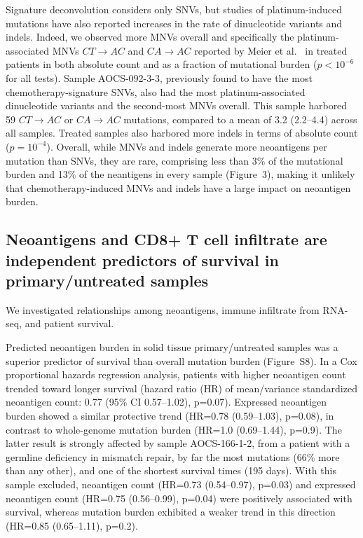 \documentclass[linenumbers]{bmcart}
\begin{document}
Signature deconvolution considers only SNVs, but studies of platinum-induced mutations have also reported increases in the rate of dinucleotide variants and indels. Indeed, we observed more MNVs overall and specifically the platinum-associated MNVs $CT \rightarrow AC$ and $CA \rightarrow AC$ reported by Meier et al.~\cite{Meier_2014} in treated patients in both absolute count and as a fraction of mutational burden ($p < 10^{-6}$ for all tests). Sample AOCS-092-3-3, previously found to have the most chemotherapy-signature SNVs, also had the most platinum-associated dinucleotide variants and the second-most MNVs overall. This sample harbored 59 $CT \rightarrow AC$ or $CA \rightarrow AC$ mutations, compared to a mean of 3.2 (2.2--4.4) across all samples. Treated samples also harbored more indels in terms of absolute count ($p=10^{-4}$). Overall, while MNVs and indels generate more neoantigens per mutation than SNVs, they are rare, comprising less than 3\% of the mutational burden and 13\% of the neantigens in every sample (Figure~3), making it unlikely that chemotherapy-induced MNVs and indels have a large impact on neoantigen burden.

\subsection*{Neoantigens and CD8+ T cell infiltrate are independent predictors of survival in primary/untreated samples}


We investigated relationships among neoantigens, immune infiltrate from RNA-seq, and patient survival.

Predicted neoantigen burden in solid tissue primary/untreated samples was a superior predictor of survival than overall mutation burden (Figure~S8). In a Cox proportional hazards regression analysis, patients with higher neoantigen count trended toward longer survival (hazard ratio (HR) of mean/variance standardized neoantigen count: 0.77 (95\% CI 0.57--1.02), p=0.07). Expressed neoantigen burden showed a similar protective trend (HR=0.78 (0.59--1.03), p=0.08), in contrast to whole-genome mutation burden (HR=1.0 (0.69--1.44), p=0.9). The latter result is strongly affected by sample AOCS-166-1-2, from a patient with a germline deficiency in mismatch repair, by far the most mutations (66\% more than any other), and one of the shortest survival times (195 days). With this sample excluded, neoantigen count (HR=0.73 (0.54--0.97), p=0.03) and expressed neoantigen count (HR=0.75 (0.56--0.99), p=0.04) were positively associated with survival, whereas mutation burden exhibited a weaker trend in this direction (HR=0.85 (0.65--1.11), p=0.2).
\end{document}

